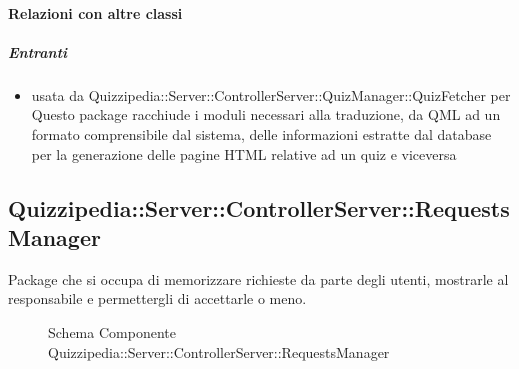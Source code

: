 \paragraph{Relazioni con altre classi}
\subparagraph{Entranti}
\begin{itemize}
\item usata da Quizzipedia::Server::ControllerServer::QuizManager::QuizFetcher per Questo package racchiude i moduli necessari alla traduzione, da QML ad un formato comprensibile dal sistema, delle informazioni estratte dal database per la generazione delle pagine HTML relative ad un quiz e viceversa
\end{itemize}
\subsection{Quizzipedia::Server::ControllerServer::RequestsManager}
Package che si occupa di memorizzare richieste da parte degli utenti, mostrarle al responsabile e permettergli di accettarle o meno.
\begin{figure}[H]
\centering
\noindent{}
\caption[Schema Componente Quizzipedia::Server::ControllerServer::RequestsManager]{Schema Componente Quizzipedia::Server::ControllerServer::RequestsManager}
\end{figure}
